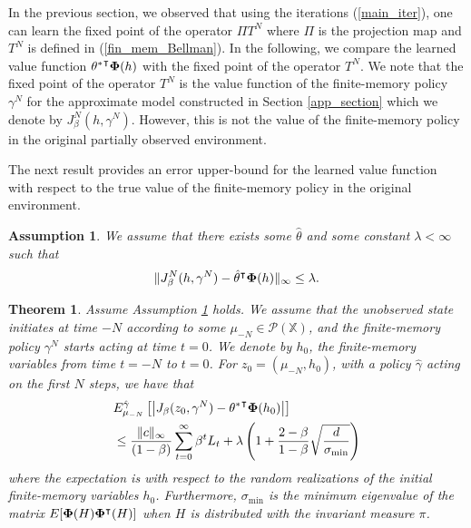\documentclass[11pt]{article}
\newtheorem{assumption}{Assumption}
\newtheorem{theorem}{Theorem}
\def\P{{\mathcal P}}
\begin{document}
In the previous section, we observed that  using the iterations (\ref{main_iter}), one can learn the fixed point of the operator $\Pi T^N$ where $\Pi$ is the projection map and $T^N$ is defined in (\ref{fin_mem_Bellman}). In the following, we compare the learned value function ${\theta^*}^\intercal {\bf \Phi}(h)$ with the fixed point of the operator $T^N$. We note that the fixed point of the operator $T^N$ is the value function of the finite-memory policy $\gamma^N$ for the approximate model constructed in Section \ref{app_section} which we denote by $J_\beta^N(h,\gamma^N)$. However, this is not the value of the finite-memory policy in the original partially observed environment.

The next result  provides an error upper-bound for the learned value function with respect to the true value of the finite-memory policy in the original environment.
\begin{assumption}\label{near_lin_pomdp}
We assume that there exists some $\hat{\theta}$ and some constant $\lambda<\infty$ such that 
\begin{align*}
\| J_\beta^N(h,\gamma^N) - \hat{\theta}^\intercal {\bf \Phi}(h)\|_\infty \leq \lambda. 
\end{align*}
\end{assumption}
\begin{theorem}
Assume Assumption \ref{near_lin_pomdp} holds. We assume that the unobserved state initiates at time $-N$ according to some $\mu_{-N}\in \P(\mathds{X})$, and the finite-memory policy $\gamma^N$ starts acting at time $t=0$. We denote by $h_0$, the finite-memory variables from time $t=-N$ to $t=0$. For ${z}_0=(\mu_{-N},h_0)$, with a policy $\hat{\gamma}$ acting on the first $N$ steps, we have that
\begin{align*}
&E_{\mu_{-N}}^{\hat{\gamma}}\left[\left|J_\beta({z}_0,{\gamma^N}) -{\theta^*}^\intercal {\bf \Phi}(h_0)\right|\right]\\
&\leq  \frac{\|c\|_\infty }{(1-\beta)}\sum_{t=0}^\infty\beta^tL_t + \lambda\left(1+ \frac{2-\beta}{1-\beta}  \sqrt{\frac{d}{\sigma_{\min}}  }\right)
\end{align*}
 where the expectation is with respect to the random realizations of the initial finite-memory variables $h_0$.  Furthermore,  $\sigma_{\min}$ is the minimum eigenvalue of the matrix $E[{\bf \Phi}(H) {\bf \Phi}^\intercal(H)  ] $ when $H$ is distributed with the invariant measure $\pi$.
\end{theorem}
\end{document}
